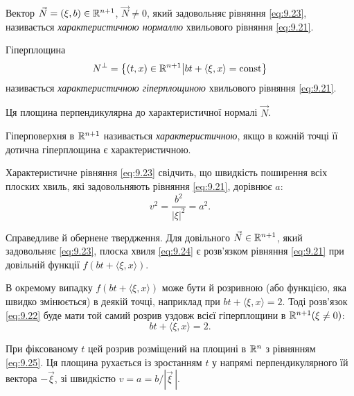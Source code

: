 \begin{definition}
    Вектор $\vec N = (\xi, b) \in \mathbb{R}^{n + 1}$, $\vec N \ne 0$, який задовольняє рівняння \eqref{eq:9.23}, називається \textit{характеристичною нормаллю} хвильового рівняння \eqref{eq:9.21}.
\end{definition}

\begin{definition}
    Гіперплощина
    \begin{equation}
        N^\perp = \left\{(t, x) \in \RR^{n + 1} \middle| b t + \langle \xi, x \rangle = \const \right\}
    \end{equation}
    називається \textit{характеристичною гіперплощиною} хвильового рівняння \eqref{eq:9.21}.
\end{definition}
 
Ця площина перпендикулярна до характеристичної нормалі $\vec N$.

\begin{definition}
    Гіперповерхня в $\mathbb{R}^{n + 1}$ називається \textit{характеристичною}, якщо в кожній точці її дотична гіперплощина є характеристичною.    
\end{definition}

Характеристичне рівняння \eqref{eq:9.23} свідчить, що швидкість поширення всіх плоских хвиль, які задовольняють рівняння \eqref{eq:9.21}, дорівнює $a$:
\begin{equation}
    \label{eq:9.24}
    v^2 = \frac{b^2}{\left| \xi \right|^2} = a^2.
\end{equation}

Справедливе й обернене твердження. Для довільного $\vec N \in \mathbb{R}^{n + 1}$, який задовольняє \eqref{eq:9.23}, плоска хвиля \eqref{eq:9.24} є розв'язком рівняння \eqref{eq:9.21} при довільній функції $f(bt + \langle \xi, x \rangle)$. \medskip

В окремому випадку $f(b t + \langle \xi, x \rangle)$ може бути й розривною (або функцією, яка швидко змінюється) в деякій точці, наприклад при $b t + \langle \xi, x \rangle = 2$. Тоді розв'язок \eqref{eq:9.22} буде мати той самий розрив уздовж всієї гіперплощини в $\mathbb{R}^{n + 1}(\xi \ne 0)$:
\begin{equation}
    \label{eq:9.25}
    b t + \langle \xi, x \rangle = 2.
\end{equation}

При фіксованому $t$ цей розрив розміщений на площині в $\mathbb{R}^n$ з рівнянням \eqref{eq:9.25}. Ця площина рухається із зростанням $t$ у напрямі перпендикулярного їй вектора $- \vec \xi$, зі швидкістю $v = a = b / \left| \vec \xi \, \right|$. \medskip

